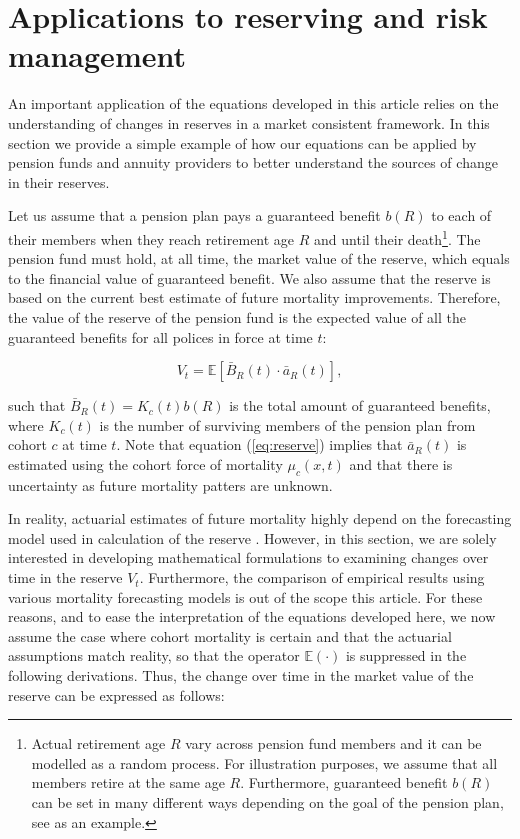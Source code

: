 \documentclass[12pt]{article}
\begin{document}
\FloatBarrier
\section{Applications to reserving and risk management}\label{sec:5_Reserves}

An important application of the equations developed in this article relies on the understanding of changes in reserves in a market consistent framework. In this section we provide a simple example of how our equations can be applied by pension funds and annuity providers to better understand the sources of change in their reserves. 


Let us assume that a pension plan pays a guaranteed benefit $b(R)$ to each of their members when they reach retirement age $R$ and until their death\footnote{Actual retirement age $R$ vary across pension fund members and it can be modelled as a random process. For illustration purposes, we assume that all members retire at the same age $R$. Furthermore, guaranteed benefit $b(R)$ can be set in many different ways depending on the goal of the pension plan, see \citet{jarner2017long} as an example.}. The pension fund must hold, at all time, the market value of the reserve, which equals to the financial value of guaranteed benefit. We also assume that the reserve is based on the current best estimate of future mortality improvements. Therefore, the value of the reserve of the pension fund is the expected value of all the guaranteed benefits for all polices in force at time $t$:

\begin{equation}\label{eq:reserve}
	V_t= \mathbb{E}[\bar{B}_R(t) \cdot \bar{a}_R(t)],
\end{equation}

such that $\bar{B}_R(t)=K_c(t)b(R)$ is the total amount of guaranteed benefits, where $K_c(t)$ is the number of surviving members of the pension plan from cohort $c$ at time $t$. Note that equation (\ref{eq:reserve}) implies that $\bar{a}_R(t)$ is estimated using the cohort force of mortality $\mu_c(x,t)$ and that there is uncertainty as future mortality patters are unknown.

In reality, actuarial estimates of future mortality highly depend on the forecasting model used in calculation of the reserve \citep{bergeron2020alternative}. However, in this section, we are solely interested in developing mathematical formulations to examining changes over time in the reserve $V_t$. Furthermore, the comparison of empirical results using various mortality forecasting models is out of the scope this article. For these reasons, and to ease the interpretation of the equations developed here, we now assume the case where cohort mortality is certain and that the actuarial assumptions match reality, so that the operator  $\mathbb{E}(\cdot)$ is suppressed in the following derivations. Thus, the change over time in the market value of the reserve can be expressed as follows:
\end{document}
